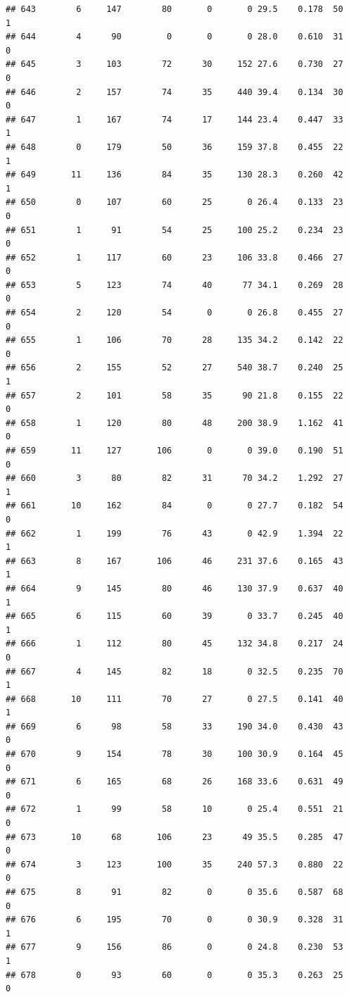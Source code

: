 \documentclass[11pt, a4paper]{article}\usepackage[]{graphicx}\usepackage[]{xcolor}
\makeatletter
\newenvironment{kframe}{%
 \def\at@end@of@kframe{}%
 \ifinner\ifhmode%
  \def\at@end@of@kframe{\end{minipage}}%
  \begin{minipage}{\columnwidth}%
 \fi\fi%
 \def\FrameCommand##1{\hskip\@totalleftmargin \hskip-\fboxsep
 \colorbox{shadecolor}{##1}\hskip-\fboxsep
     \hskip-\linewidth \hskip-\@totalleftmargin \hskip\columnwidth}%
 \MakeFramed {\advance\hsize-\width
   \@totalleftmargin\z@ \linewidth\hsize
   \@setminipage}}%
 {\par\unskip\endMakeFramed%
 \at@end@of@kframe}
\newenvironment{knitrout}{}{} %
\makeatother
\begin{document}
\begin{knitrout}
\begin{kframe}
\begin{verbatim}
## 643        6     147        80       0       0 29.5    0.178  50    1
## 644        4      90         0       0       0 28.0    0.610  31    0
## 645        3     103        72      30     152 27.6    0.730  27    0
## 646        2     157        74      35     440 39.4    0.134  30    0
## 647        1     167        74      17     144 23.4    0.447  33    1
## 648        0     179        50      36     159 37.8    0.455  22    1
## 649       11     136        84      35     130 28.3    0.260  42    1
## 650        0     107        60      25       0 26.4    0.133  23    0
## 651        1      91        54      25     100 25.2    0.234  23    0
## 652        1     117        60      23     106 33.8    0.466  27    0
## 653        5     123        74      40      77 34.1    0.269  28    0
## 654        2     120        54       0       0 26.8    0.455  27    0
## 655        1     106        70      28     135 34.2    0.142  22    0
## 656        2     155        52      27     540 38.7    0.240  25    1
## 657        2     101        58      35      90 21.8    0.155  22    0
## 658        1     120        80      48     200 38.9    1.162  41    0
## 659       11     127       106       0       0 39.0    0.190  51    0
## 660        3      80        82      31      70 34.2    1.292  27    1
## 661       10     162        84       0       0 27.7    0.182  54    0
## 662        1     199        76      43       0 42.9    1.394  22    1
## 663        8     167       106      46     231 37.6    0.165  43    1
## 664        9     145        80      46     130 37.9    0.637  40    1
## 665        6     115        60      39       0 33.7    0.245  40    1
## 666        1     112        80      45     132 34.8    0.217  24    0
## 667        4     145        82      18       0 32.5    0.235  70    1
## 668       10     111        70      27       0 27.5    0.141  40    1
## 669        6      98        58      33     190 34.0    0.430  43    0
## 670        9     154        78      30     100 30.9    0.164  45    0
## 671        6     165        68      26     168 33.6    0.631  49    0
## 672        1      99        58      10       0 25.4    0.551  21    0
## 673       10      68       106      23      49 35.5    0.285  47    0
## 674        3     123       100      35     240 57.3    0.880  22    0
## 675        8      91        82       0       0 35.6    0.587  68    0
## 676        6     195        70       0       0 30.9    0.328  31    1
## 677        9     156        86       0       0 24.8    0.230  53    1
## 678        0      93        60       0       0 35.3    0.263  25    0

\end{verbatim}
\end{kframe}
\end{knitrout}
\end{document}
